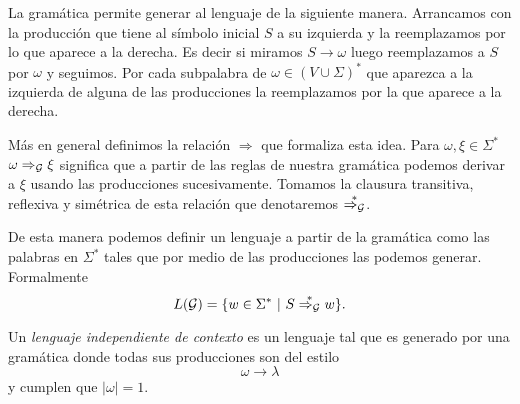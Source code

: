 \documentclass[tesis.tex]{subfiles}
\begin{document}
La gramática permite generar al lenguaje de la siguiente manera. Arrancamos con la producción que tiene al símbolo inicial $S$ a su izquierda y la reemplazamos por lo que aparece a la derecha. Es decir si miramos $S \to \omega$ luego reemplazamos a $S$ por $\omega$ y seguimos. Por cada subpalabra de $\omega\in (V \cup \Sigma)^*$ que aparezca a la izquierda de alguna de las producciones la reemplazamos por la que aparece a la derecha. 

Más en general definimos la relación $\Rightarrow$ que formaliza esta idea. Para $\omega, \xi \in \Sigma^*$  $\omega \Rightarrow_{\cal G} \xi$ significa que a partir de las reglas de nuestra gramática podemos derivar a $\xi$ usando las producciones sucesivamente. Tomamos la clausura transitiva, reflexiva y simétrica de esta relación que denotaremos $\overset{*}{\Rightarrow_{\cal G}}$.


De esta manera podemos definir un lenguaje a partir de la gramática como las palabras en $\Sigma^*$ tales que por medio de las producciones las podemos generar. Formalmente
\[
L({\cal G}) = \{ w \in \Sigma^* \ | \ S \overset{*}{\Rightarrow_{\cal G}} w   \}.
\]



Un \textit{lenguaje independiente de contexto} es un lenguaje tal que es generado por una gramática donde todas sus producciones son del estilo
\[
 \omega \to \lambda
\]
y cumplen que $|\omega| = 1$. 
\end{document}
